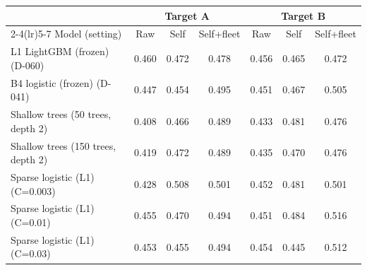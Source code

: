 \begin{tabular}{@{}lcccccc@{}}
\toprule
 & \multicolumn{3}{c}{Target A} & \multicolumn{3}{c}{Target B} \\
\cmidrule(lr){2-4}\cmidrule(lr){5-7}
Model (setting) & Raw & Self & Self+fleet & Raw & Self & Self+fleet \\
\midrule
L1 LightGBM (frozen) (D-060) & 0.460 & 0.472 & 0.478 & 0.456 & 0.465 & 0.472 \\
B4 logistic (frozen) (D-041) & 0.447 & 0.454 & 0.495 & 0.451 & 0.467 & 0.505 \\
Shallow trees (50 trees, depth 2) & 0.408 & 0.466 & 0.489 & 0.433 & 0.481 & 0.476 \\
Shallow trees (150 trees, depth 2) & 0.419 & 0.472 & 0.489 & 0.435 & 0.470 & 0.476 \\
Sparse logistic (L1) (C=0.003) & 0.428 & 0.508 & 0.501 & 0.452 & 0.481 & 0.501 \\
Sparse logistic (L1) (C=0.01) & 0.455 & 0.470 & 0.494 & 0.451 & 0.484 & 0.516 \\
Sparse logistic (L1) (C=0.03) & 0.453 & 0.455 & 0.494 & 0.454 & 0.445 & 0.512 \\
\bottomrule
\end{tabular}
